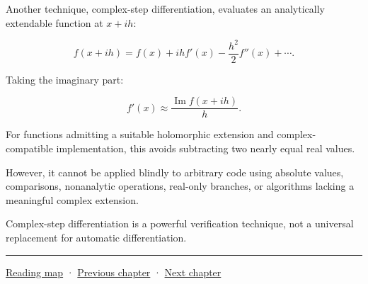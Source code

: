 Another technique, complex-step differentiation, evaluates an analytically extendable function at \(x+ih\):

\[
f(x+ih) = f(x)+ihf'(x) -\frac{h^2}{2}f''(x)+\cdots.
\]

Taking the imaginary part:

\[
\boxed{ f'(x)\approx \frac{\operatorname{Im}f(x+ih)}h }.
\]

For functions admitting a suitable holomorphic extension and complex-compatible implementation, this avoids subtracting two nearly equal real values.

However, it cannot be applied blindly to arbitrary code using absolute values, comparisons, nonanalytic operations, real-only branches, or algorithms lacking a meaningful complex extension.

Complex-step differentiation is a powerful verification technique, not a universal replacement for automatic differentiation.

\begin{center}\rule{0.5\linewidth}{0.5pt}\end{center}

\hyperref[volume-reading-map]{Reading map} · \hyperref[02-foundations-ii-ch024-waiting-times-covariance-and-matrix-decomposition]{Previous chapter} · \hyperref[02-foundations-ii-ch026-matrix-functions-and-nonlinear-least-squares]{Next chapter}

